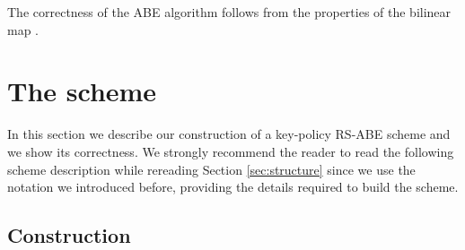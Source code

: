 \documentclass[a4paper,10pt]{article}
\begin{document}
The correctness of the ABE algorithm follows from the properties of the bilinear map .
	
	
	
	\pagebreak
	\section{The scheme}\label{sec:scheme}
	
	In this section we describe our construction of a key-policy RS-ABE scheme and we show its correctness. We strongly recommend the reader to read the following scheme description while rereading Section \ref{sec:structure} since we use the notation we introduced before, providing the details required to build the scheme.
	
	\subsection{Construction}
	
\end{document}
